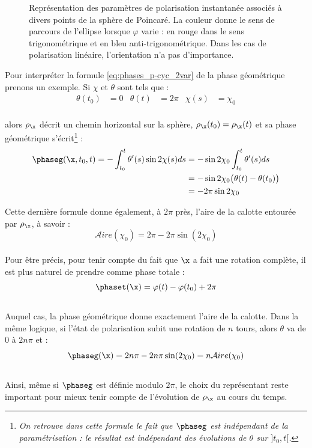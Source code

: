 \begin{figure}[H]
	
	\caption[\DONE États de polarisation associés à divers point de la sphère de Poincaré.]{Représentation des paramètres de polarisation instantanée associés à divers points de la sphère de Poincaré. La couleur donne le sens de parcours de l'ellipse lorsque $\varphi$ varie : en rouge dans le sens trigonométrique et en bleu anti-trigonométrique. Dans les cas de polarisation linéaire, l'orientation n'a pas d'importance.}
	\end{figure}
	
	
	Pour interpréter la formule \eqref{eq:phases_p-cyc_2var} de la phase géométrique prenons un exemple. Si $\chi$ et $\theta$ sont tels que :
	\begin{align*}
\theta(t_0) &= 0  &  \theta(t) &= 2\pi  &  \chi(s) &= \chi_0
\end{align*}
\\
alors $\rho_{\x}$ décrit un chemin horizontal sur la sphère, $\rho_{\x}(t_0) = \rho_{\x}(t)$ et sa phase géométrique s'écrit\footnote{\itshape 
On retrouve dans cette formule le fait que $\phaseg$ est indépendant de la paramétrisation : le résultat est indépendant des évolutions de $\theta$ sur $]t_0,t[$.} :
\begin{align*}
\phaseg(\x, t_0, t) = -\int_{t_0}^t \theta'(s) \sin 2\chi(s) ds &= - \sin 2\chi_0 \int_{t_0}^t \theta'(s) ds \\
&= - \sin 2\chi_0 \big( \theta(t) - \theta(t_0)\big) \\
&= - 2\pi\sin 2\chi_0
\end{align*}
\skipl

Cette dernière formule donne également, à $2\pi$ près, l’aire de la calotte entourée par $\rho_{\x}$, à savoir :
\[\mathcal{A}ire(\chi_0) = 2\pi - 2\pi \sin(2\chi_0)\]
\\
Pour être précis, pour tenir compte du fait que $\x$ a fait une rotation complète, il est plus naturel de prendre comme phase totale :
\[\phaset(\x) = \varphi(t) - \varphi(t_0) + 2\pi\]
\\
Auquel cas, la phase géométrique donne exactement l'aire de la calotte. Dans la même logique, si l'état de polarisation subit une rotation de $n$ tours, alors $\theta$ va de $0$ à $2n\pi$ et :
\[\phaseg(\x) = 2n\pi - 2n\pi\sin(2\chi_0) = n\mathcal{A}ire(\chi_0)\]
\\
Ainsi, même si $\phaseg$ est définie modulo $2\pi$, le choix du représentant reste important pour mieux tenir compte de l'évolution de $\rho_{\x}$ au cours du temps.
\\

